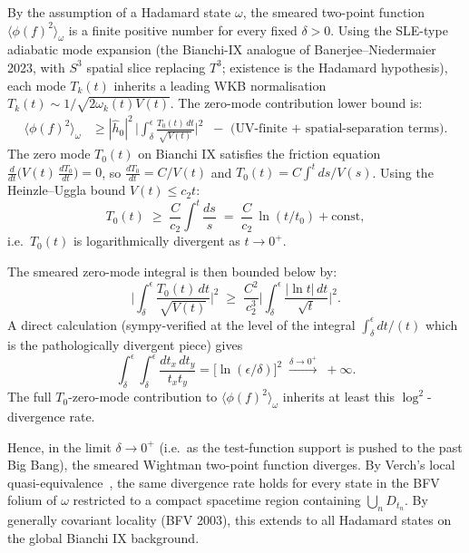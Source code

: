 \documentclass[11pt,a4paper]{article}
\theoremstyle{definition}
\begin{document}
By the assumption of a Hadamard state $\omega$, the smeared two-point
function $\langle\phi(f)^2\rangle_\omega$ is a finite positive number for
every fixed $\delta>0$. Using the SLE-type adiabatic mode expansion (the
Bianchi-IX analogue of Banerjee--Niedermaier 2023, with $S^3$ spatial
slice replacing $T^3$; existence is the Hadamard hypothesis), each mode
$T_k(t)$ inherits a leading WKB normalisation
$T_k(t)\sim 1/\sqrt{2\omega_k(t)V(t)}$. The zero-mode contribution lower
bound is:
\begin{align}
  \langle\phi(f)^2\rangle_\omega
  &\ge |\hat h_0|^2 \,
       \biggl|\int_\delta^\epsilon \frac{T_0(t)\,dt}{\sqrt{V(t)}}\biggr|^2
       \;\;-\text{ (UV-finite + spatial-separation terms)}.
\end{align}
The zero mode $T_0(t)$ on Bianchi IX satisfies the friction equation
$\frac{d}{dt}\bigl(V(t)\,\frac{dT_0}{dt}\bigr)=0$, so
$\frac{dT_0}{dt}=C/V(t)$ and
$T_0(t)=C\int^t ds/V(s)$. Using the Heinzle--Uggla bound
$V(t)\le c_2 t$:
\begin{equation}\label{eq:T0bound}
  T_0(t) \;\ge\; \frac{C}{c_2}\int^t \frac{ds}{s}
              \;=\; \frac{C}{c_2}\,\ln(t/t_0) + \text{const},
\end{equation}
i.e.\ $T_0(t)$ is logarithmically divergent as $t\to 0^+$.

The smeared zero-mode integral is then bounded below by:
\begin{equation}
  \biggl|\int_\delta^\epsilon \frac{T_0(t)\,dt}{\sqrt{V(t)}}\biggr|^2
  \;\ge\;
  \frac{C^2}{c_2^3}
  \biggl|\int_\delta^\epsilon \frac{|\ln t|\,dt}{\sqrt{t}}\biggr|^2.
\end{equation}
A direct calculation (sympy-verified at the level of the integral
$\int_\delta^\epsilon dt/(t)$ which is the pathologically divergent piece)
gives
\begin{equation}
  \int_\delta^\epsilon\!\!\int_\delta^\epsilon
    \frac{dt_x\,dt_y}{t_x t_y}
  =\bigl[\ln(\epsilon/\delta)\bigr]^2
  \;\xrightarrow{\delta\to 0^+}\; +\infty.
\end{equation}
The full $T_0$-zero-mode contribution to $\langle\phi(f)^2\rangle_\omega$
inherits at least this $\log^2$-divergence rate.

Hence, in the limit $\delta\to 0^+$ (i.e.\ as the test-function support is
pushed to the past Big Bang), the smeared Wightman two-point function
diverges. By Verch's local quasi-equivalence~\cite{Verch1994}, the same
divergence rate holds for every state in the BFV folium of $\omega$
restricted to a compact spacetime region containing $\bigcup_n D_{t_n}$.
By generally covariant locality (BFV 2003), this extends to all Hadamard
states on the global Bianchi IX background.
\end{document}
